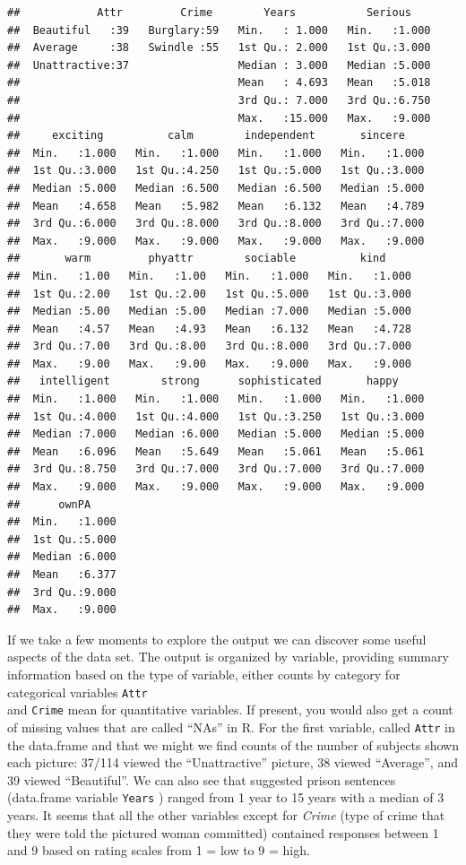 \documentclass[]{book}
\begin{document}
\begin{verbatim}
##            Attr         Crime        Years           Serious     
##  Beautiful   :39   Burglary:59   Min.   : 1.000   Min.   :1.000  
##  Average     :38   Swindle :55   1st Qu.: 2.000   1st Qu.:3.000  
##  Unattractive:37                 Median : 3.000   Median :5.000  
##                                  Mean   : 4.693   Mean   :5.018  
##                                  3rd Qu.: 7.000   3rd Qu.:6.750  
##                                  Max.   :15.000   Max.   :9.000  
##     exciting          calm        independent       sincere     
##  Min.   :1.000   Min.   :1.000   Min.   :1.000   Min.   :1.000  
##  1st Qu.:3.000   1st Qu.:4.250   1st Qu.:5.000   1st Qu.:3.000  
##  Median :5.000   Median :6.500   Median :6.500   Median :5.000  
##  Mean   :4.658   Mean   :5.982   Mean   :6.132   Mean   :4.789  
##  3rd Qu.:6.000   3rd Qu.:8.000   3rd Qu.:8.000   3rd Qu.:7.000  
##  Max.   :9.000   Max.   :9.000   Max.   :9.000   Max.   :9.000  
##       warm         phyattr        sociable          kind      
##  Min.   :1.00   Min.   :1.00   Min.   :1.000   Min.   :1.000  
##  1st Qu.:2.00   1st Qu.:2.00   1st Qu.:5.000   1st Qu.:3.000  
##  Median :5.00   Median :5.00   Median :7.000   Median :5.000  
##  Mean   :4.57   Mean   :4.93   Mean   :6.132   Mean   :4.728  
##  3rd Qu.:7.00   3rd Qu.:8.00   3rd Qu.:8.000   3rd Qu.:7.000  
##  Max.   :9.00   Max.   :9.00   Max.   :9.000   Max.   :9.000  
##   intelligent        strong      sophisticated       happy      
##  Min.   :1.000   Min.   :1.000   Min.   :1.000   Min.   :1.000  
##  1st Qu.:4.000   1st Qu.:4.000   1st Qu.:3.250   1st Qu.:3.000  
##  Median :7.000   Median :6.000   Median :5.000   Median :5.000  
##  Mean   :6.096   Mean   :5.649   Mean   :5.061   Mean   :5.061  
##  3rd Qu.:8.750   3rd Qu.:7.000   3rd Qu.:7.000   3rd Qu.:7.000  
##  Max.   :9.000   Max.   :9.000   Max.   :9.000   Max.   :9.000  
##      ownPA      
##  Min.   :1.000  
##  1st Qu.:5.000  
##  Median :6.000  
##  Mean   :6.377  
##  3rd Qu.:9.000  
##  Max.   :9.000
\end{verbatim}

If we take a few moments to explore the output we can discover some
useful aspects of the data set. The output is organized by variable,
providing summary information based on the type of variable, either
counts by category for categorical variables \texttt{Attr}\\
and \texttt{Crime} mean for quantitative variables. If present, you
would also get a count of missing values that are called ``NAs'' in R.
For the first variable, called \texttt{Attr} in the data.frame and that
we might we find counts of the number of subjects shown each picture:
37/114 viewed the ``Unattractive'' picture, 38 viewed ``Average'', and
39 viewed ``Beautiful''. We can also see that suggested prison sentences
(data.frame variable \texttt{Years} ) ranged from 1 year to 15 years
with a median of 3 years. It seems that all the other variables except
for \emph{Crime} (type of crime that they were told the pictured woman
committed) contained responses between 1 and 9 based on rating scales
from 1 = low to 9 = high.
\end{document}
